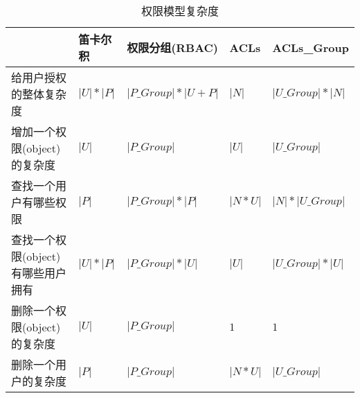 \documentclass{article}
\begin{document}
\begin{CJK*}{UTF8}{gbsn}


\begin{table}[]
\caption{权限模型复杂度}
\centering
\begin{tabular}{|l|l|l|l|l|} 
\hline
    & 笛卡尔积  &      权限分组(RBAC) & ACLs  &  ACLs\_Group   \\ 
\hline
给用户授权的整体复杂度   & $|U|*|P|$ & $|P\_Group| * |U + P|$ & $|N|$  & $|U\_Group| * |N|$  \\
增加一个权限(object)的复杂度 & $|U|$  & $|P\_Group|$  & $|U|$  & $|U\_Group|$   \\
查找一个用户有哪些权限      & $|P|$  &   $|P\_Group| * |P|$   & $|N * U|$  &   $|N| * |U\_Group|$ \\
查找一个权限(object)有哪些用户拥有    & $|U|*|P|$   &  $|P\_Group| * |U|$  & $|U|$  & $|U\_Group| * |U|$   \\
删除一个权限(object)的复杂度     &  $|U|$  &  $|P\_Group|$  &  $1$ & $1$  \\
删除一个用户的复杂度    &  $|P|$  &  $|P\_Group|$   & $|N*U|$  &  $|U\_Group|$  \\
\hline
\end{tabular}
\end{table}

\end{CJK*}
\end{document}
